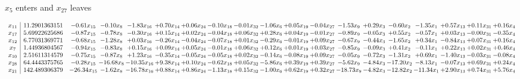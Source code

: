\documentclass[9pt]{article}
\begin{document}
 $ x_{5} $ enters and $ x_{27} $ leaves 

 \[\begin{array}{c| c c@{\hskip 2pt} c@{\hskip 2pt} c@{\hskip 2pt} c@{\hskip 2pt} c@{\hskip 2pt} c@{\hskip 2pt} c@{\hskip 2pt} c@{\hskip 2pt} c@{\hskip 2pt} c@{\hskip 2pt} c@{\hskip 2pt} c@{\hskip 2pt} c@{\hskip 2pt} c@{\hskip 2pt} c@{\hskip 2pt} c@{\hskip 2pt} c@{\hskip 2pt} }
 x_{11}   &  11.2901363151 & -0.61 x_{15} & -0.10 x_{8} & -1.83 x_{16} & +  0.70 x_{14} & +  0.06 x_{24} & -0.10 x_{18} & -0.01 x_{32} & -1.06 x_{6} & +  0.05 x_{19} & -0.04 x_{27} & -1.53 x_{9} & +  0.29 x_{3} & -0.60 x_{2} & -1.35 x_{1} & +  0.57 x_{13} & +  0.11 x_{31} & +  0.16 x_{4}\\
 x_{17}   &  5.69922625686 & -0.87 x_{15} & -0.78 x_{8} & -0.30 x_{16} & +  0.15 x_{14} & +  0.02 x_{24} & -0.04 x_{18} & +  0.06 x_{32} & +  0.28 x_{6} & +  0.04 x_{19} & -0.01 x_{27} & -0.89 x_{9} & -0.05 x_{3} & +  0.55 x_{2} & -0.57 x_{1} & +  0.03 x_{13} & -0.00 x_{31} & -0.35 x_{4}\\
 x_{12}   &  6.77031369771 & -0.68 x_{15} & -1.28 x_{8} & +  0.03 x_{16} & -0.26 x_{14} & -0.04 x_{24} & -0.07 x_{18} & +  0.01 x_{32} & -0.29 x_{6} & -0.01 x_{19} & +  0.09 x_{27} & -0.67 x_{9} & -0.44 x_{3} & -1.65 x_{2} & +  0.34 x_{1} & -0.84 x_{13} & +  0.07 x_{31} & +  0.16 x_{4}\\
 x_{7}   &  1.44936804567 & -0.94 x_{15} & -0.83 x_{8} & +  0.15 x_{16} & +  0.09 x_{14} & +  0.05 x_{24} & -0.01 x_{18} & +  0.06 x_{32} & +  0.12 x_{6} & +  0.01 x_{19} & +  0.03 x_{27} & -0.85 x_{9} & -0.09 x_{3} & +  0.41 x_{2} & -0.11 x_{1} & +  0.22 x_{13} & +  0.02 x_{31} & +  0.46 x_{4}\\
 x_{10}   &  2.51611314579 & -0.75 x_{15} & -0.87 x_{8} & +  1.23 x_{16} & -0.35 x_{14} & -0.05 x_{24} & -0.05 x_{18} & +  0.02 x_{32} & -0.14 x_{6} & -0.08 x_{19} & +  0.09 x_{27} & -0.05 x_{9} & -0.72 x_{3} & -1.31 x_{2} & +  0.69 x_{1} & -1.40 x_{13} & -0.03 x_{31} & -0.08 x_{4}\\
 x_{28}   &  64.4443375765 & -0.28 x_{15} & -16.68 x_{8} & -10.35 x_{16} & +  9.38 x_{14} & +  0.10 x_{24} & -0.62 x_{18} & +  0.05 x_{32} & -5.86 x_{6} & +  0.39 x_{19} & +  0.39 x_{27} & -5.62 x_{9} & -4.84 x_{3} & -17.20 x_{2} & -8.13 x_{1} & -0.07 x_{13} & +  0.69 x_{31} & +  0.24 x_{4}\\
 x_{21}   &  142.489306379 & -26.34 x_{15} & -1.62 x_{8} & -16.78 x_{16} & +  0.88 x_{14} & +  0.86 x_{24} & -1.13 x_{18} & +  0.15 x_{32} & -1.00 x_{6} & +  0.62 x_{19} & +  0.32 x_{27} & -18.73 x_{9} & -4.82 x_{3} & -12.82 x_{2} & -11.34 x_{1} & +  2.90 x_{13} & +  0.74 x_{31} & +  5.76 x_{4}\\

\end{array}\]
\end{document}
